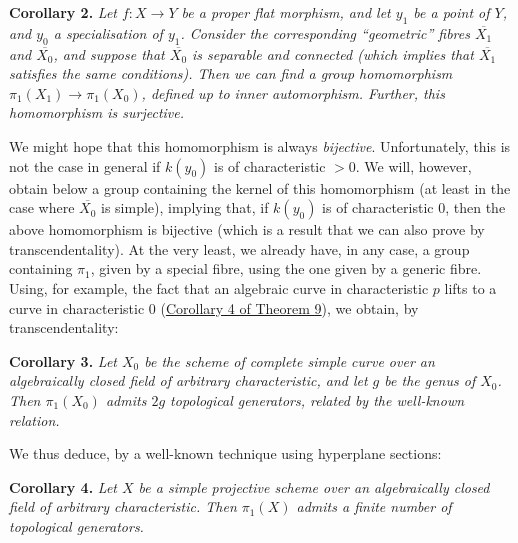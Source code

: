 \documentclass{article}
\newenvironment{itenv}[1]
  {\phantomsection\par\smallskip\noindent\textbf{#1.}\itshape}
  {\par\smallskip}
\newcommand{\oldpage}[1]{\marginpar{\footnotesize$\Big\vert$ \textit{p.~#1}}}
\theoremstyle{definition}
\theoremstyle{definition}
\theoremstyle{definition}
\theoremstyle{definition}
\theoremstyle{remark}
\begin{document}
\leavevmode{}%
\begin{itenv}{Corollary 2}
Let \(f\colon X\to Y\) be a proper flat morphism, and let \(y_1\) be a point of \(Y\), and \(y_0\) a specialisation of \(y_1\).
Consider the corresponding ``geometric'' fibres \(\overline{X_1}\) and \(\overline{X_0}\), and suppose that \(\overline{X_0}\) is separable and connected (which implies that \(\overline{X_1}\) satisfies the same conditions).
Then we can find a group homomorphism \(\pi_1(X_1)\to\pi_1(X_0)\), defined up to inner automorphism.
Further, this homomorphism is \emph{surjective}.

\end{itenv}

\oldpage{182-25}We might hope that this homomorphism is always \emph{bijective}.
Unfortunately, this is not the case in general if \(k(y_0)\) is of characteristic \(>0\).
We will, however, obtain below a group containing the kernel of this homomorphism (at least in the case where \(\overline{X_0}\) is simple), implying that, if \(k(y_0)\) is of characteristic \(0\), then the above homomorphism is bijective (which is a result that we can also prove by transcendentality).
At the very least, we already have, in any case, a group containing \(\pi_1\), given by a special fibre, using the one given by a generic fibre.
Using, for example, the fact that an algebraic curve in characteristic \(p\) lifts to a curve in characteristic \(0\) (\protect\hyperlink{fga-2-theorem-9-corollary-4}{Corollary 4 of Theorem 9}), we obtain, by transcendentality:

\leavevmode{}%
\begin{itenv}{Corollary 3}
Let \(X_0\) be the scheme of complete simple curve over an algebraically closed field of arbitrary characteristic, and let \(g\) be the genus of \(X_0\).
Then \(\pi_1(X_0)\) admits \(2g\) topological generators, related by the well-known relation.

\end{itenv}

We thus deduce, by a well-known technique using hyperplane sections:

\leavevmode{}%
\begin{itenv}{Corollary 4}
Let \(X\) be a simple projective scheme over an algebraically closed field of arbitrary characteristic.
Then \(\pi_1(X)\) admits a finite number of topological generators.

\end{itenv}
\end{document}
